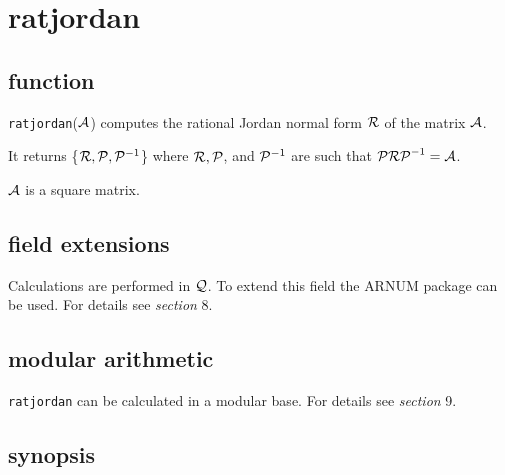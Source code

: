 \section{ratjordan}

\subsection{function}

{\tt ratjordan}(${\cal A}$) computes the rational Jordan normal form
${\cal R}$ of the matrix ${\cal A}$.

It returns \{${\cal R}, {\cal P}, {\cal P}^{-1}$\} where ${\cal R},
{\cal P}$, and ${\cal P}^{-1}$ are such that ${\cal P R P}^{-1} =
{\cal A}$.

${\cal A}$ is a square matrix.

\subsection{field extensions}

Calculations are performed in ${\cal Q}$. To extend this field the
{\small ARNUM} package can be used. For details see {\it section} 8.

\subsection{modular arithmetic}

{\tt ratjordan} can be calculated in a modular base. For details see
{\it section} 9.

\subsection{synopsis}

